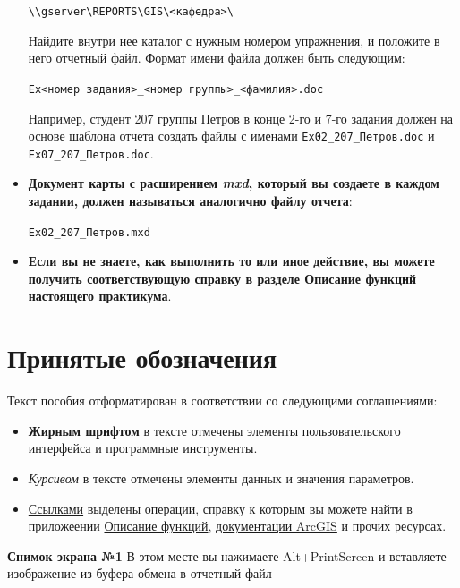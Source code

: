 \documentclass[]{book}
\providecommand{\tightlist}{%
  \setlength{\itemsep}{0pt}\setlength{\parskip}{0pt}}
\theoremstyle{definition}
\theoremstyle{definition}
\theoremstyle{definition}
\theoremstyle{remark}
\begin{document}
\begin{itemize}
  \texttt{\textbackslash{}\textbackslash{}gserver\textbackslash{}REPORTS\textbackslash{}GIS\textbackslash{}\textless{}кафедра\textgreater{}\textbackslash{}}

  Найдите внутри нее каталог с нужным номером упражнения, и положите в
  него отчетный файл. Формат имени файла должен быть следующим:

  \texttt{Ex\textless{}номер\ задания\textgreater{}\_\textless{}номер\ группы\textgreater{}\_\textless{}фамилия\textgreater{}.doc}

  Например, студент 207 группы Петров в конце 2-го и 7-го задания должен
  на основе шаблона отчета создать файлы с именами
  \texttt{Ex02\_207\_Петров.doc} и \texttt{Ex07\_207\_Петров.doc}.
\item
  \textbf{Документ карты с расширением \emph{mxd}, который вы создаете в
  каждом задании, должен называться аналогично файлу отчета}:

  \texttt{Ex02\_207\_Петров.mxd}
\item
  \textbf{Если вы не знаете, как выполнить то или иное действие, вы
  можете получить соответствующую справку в разделе
  \protect\hyperlink{manual-catalog}{Описание функций} настоящего
  практикума}.
\end{itemize}

\hypertarget{-}{%
\section*{Принятые обозначения}\label{-}}

Текст пособия отформатирован в соответствии со следующими соглашениями:

\begin{itemize}
\tightlist
\item
  \textbf{Жирным шрифтом} в тексте отмечены элементы пользовательского
  интерфейса и программные инструменты.
\item
  \emph{Курсивом} в тексте отмечены элементы данных и значения
  параметров.
\item
  \href{}{Ссылками} выделены операции, справку к которым вы можете найти
  в приложеении \protect\hyperlink{manual-catalog}{Описание функций},
  \href{https://desktop.arcgis.com/ru/documentation/}{документации
  ArcGIS} и прочих ресурсах.
\end{itemize}

\textbf{Снимок экрана №1} В этом месте вы нажимаете Alt+PrintScreen и
вставляете изображение из буфера обмена в отчетный файл
\end{document}

